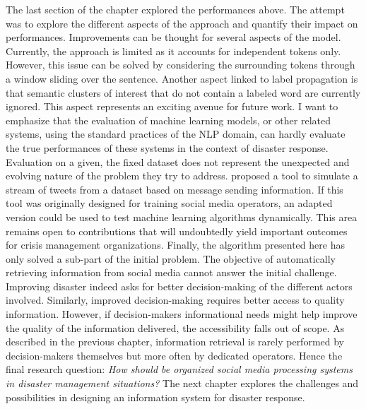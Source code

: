 The last section of the chapter explored the performances above.
The attempt was to explore the different aspects of the approach and quantify their impact on performances.
Improvements can be thought for several aspects of the model.
Currently, the approach is limited as it accounts for independent tokens only.
However, this issue can be solved by considering the surrounding tokens through a window sliding over the sentence.
Another aspect linked to label propagation is that semantic clusters of interest that do not contain a labeled word are currently ignored.
This aspect represents an exciting avenue for future work.
I want to emphasize that the evaluation of machine learning models, or other related systems, using the standard practices of the NLP domain, can hardly evaluate the true performances of these systems in the context of disaster response.
Evaluation on a given, the fixed dataset does not represent the unexpected and evolving nature of the problem they try to address.
\textcite{halseSimulatingRealtimeTwitter2019} proposed a tool to simulate a stream of tweets from a dataset based on message sending information.
If this tool was originally designed for training social media operators, an adapted version could be used to test machine learning algorithms dynamically.
This area remains open to contributions that will undoubtedly yield important outcomes for crisis management organizations.
Finally, the algorithm presented here has only solved a sub-part of the initial problem.
The objective of automatically retrieving information from social media cannot answer the initial challenge.
Improving disaster indeed asks for better decision-making of the different actors involved.
Similarly, improved decision-making requires better access to quality information.
However, if decision-makers informational needs might help improve the quality of the information delivered, the accessibility falls out of scope.
As described in the previous chapter, information retrieval is rarely performed by decision-makers themselves but more often by dedicated operators.
Hence the final research question: \textit{How should be organized social media processing systems in disaster management situations?}
The next chapter explores the challenges and possibilities in designing an information system for disaster response.

